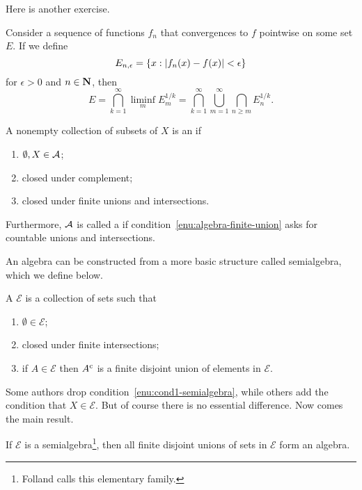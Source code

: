 Here is another exercise.

\begin{xca}
    Consider a sequence of functions $f_n$ that convergences to $f$ pointwise on some set $E$. If we define \[
        E_{n,\epsilon} = \{x:\lvert f_n(x) - f(x) \rvert < \epsilon\}
    \] for $\epsilon > 0$ and $n\in \mathbf{N}$, then \[
        E = \bigcap_{k=1}^\infty \liminf_m E_m^{1/k} = \bigcap_{k=1}^\infty \bigcup_{m=1}^\infty \bigcap_{n\geq m} E_n^{1/k}.
    \]
\end{xca}

\begin{defn}
    A nonempty collection of subsets of $X$ is an  if \begin{enumerate}
        \item $\emptyset,X \in \mathcal{A}$;
        \item closed under complement;
        \item \label{enu:algebra-finite-union} closed under finite unions and intersections.
    \end{enumerate}
    Furthermore, $\mathcal{A}$ is called a  if condition~\ref{enu:algebra-finite-union} asks for countable unions and intersections.
\end{defn}

An algebra can be constructed from a more basic structure called semialgebra, which we define below.
\begin{defn}
    A  $\mathcal{E}$ is a collection of sets such that \begin{enumerate}
        \item \label{enu:cond1-semialgebra}$\emptyset \in \mathcal{E}$;
        \item closed under finite intersections;
        \item if $A \in \mathcal{E}$ then $A^{\mathrm{c}}$ is a finite disjoint union of elements in $\mathcal{E}$.
    \end{enumerate}
\end{defn}
Some authors drop condition~\ref{enu:cond1-semialgebra}, while others add the condition that $X \in \mathcal{E}$. But of course there is no essential difference. Now comes the main result.

\begin{prop} \label{prop:semialgebra-to-algebra}
    If $\mathcal{E}$ is a semialgebra\footnote{Folland calls this elementary family.}, then all finite disjoint unions of sets in $\mathcal{E}$ form an algebra.
\end{prop}

